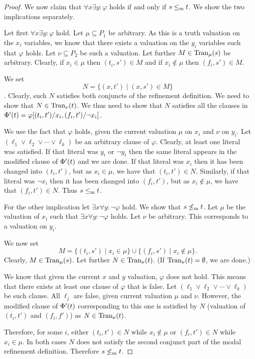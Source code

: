 \begin{proof}
%

We now claim that $\forall x \exists y : \varphi$ holds
if and only if $s \le_\mathrm m t$.
We show the two implications separately. 

Let first $\forall x \exists y : \varphi$ hold.
Let $\mu \subseteq P_1$ be arbitrary. As this is a truth valuation
on the $x_i$ variables, we know that there exists a valuation
on the $y_i$ variables such that $\varphi$ holds. Let $\nu \subseteq P_2$
be such a valuation.
Let further $M \in \mathrm{Tran}_\mu(s)$ be arbitrary.
Clearly, if $x_i \in \mu$ then $(t_i,s') \in M$ and 
if $x_i \not\in \mu$ then $(f_i,s') \in M$.

We set \[N = \{ (x,t') \mid (x,s') \in M\}\]. Clearly, such $N$ satisfies
both conjuncts of the refinement definition. We need to show that 
$N \in \mathrm{Tran}_\nu(t)$. We thus need to show that $N$ satisfies
all the clauses in $\mathrm{\Phi}'(t)=\varphi[(t_i,t')/x_i,(f_i,t')/\neg x_i]$.

We use the fact that $\varphi$ holds, given the current valuation
$\mu$ on $x_i$ and $\nu$ on $y_i$.
Let $(\ell_1 \vee \ell_2 \vee \cdots \vee \ell_k)$ be an arbitrary clause
of $\varphi$. Clearly, at least one literal was satisfied.
If that literal was $y_i$ or $\neg y_i$ then the same literal appears
in the modified clause of $\mathrm{\Phi}'(t)$ and we are done.
If that literal was $x_i$ then it has been changed into
$(t_i,t')$, but as $x_i \in \mu$, we have that $(t_i,t') \in N$.
Similarly, if that literal was $\neg x_i$ then it has been 
changed into $(f_i,t')$, but as $x_i \not\in\mu$, we have
that $(f_i,t') \in N$. Thus $s \le_\mathrm m t$.

For the other implication let 
$\exists x \forall y : \neg \varphi$ hold.  We show that $s \not\le_\mathrm m t$.
Let $\mu$ be the valuation of $x_i$ such that 
$\exists x \forall y : \neg \varphi$ holds.
Let $\nu$ be arbitrary. This corresponds to a valuation on $y_i$.

We now set 
\[
M = \{ (t_i, s') \mid x_i \in \mu \} \cup \{ (f_i, s') \mid x_i \not\in \mu \}.
\] 
Clearly, $M\in\mathrm{Tran}_\mu(s)$. Let further $N \in \mathrm{Tran}_\nu(t)$. (If $\mathrm{Tran}_\nu(t) = \emptyset$, we are done.)

We know that given the current $x$ and $y$ valuation, $\varphi$ does not hold.
This means that there exists at least one clause of $\varphi$ that is false.
Let $(\ell_1 \vee \ell_2 \vee \cdots \vee \ell_k)$ be such clause. 
All $\ell_j$ are false, given current valuation $\mu$ and $\nu$.
However, the modified clause of $\mathrm{\Phi}'(t)$ corresponding to this one
is satisfied by $N$ (valuation of $(t_i,t')$ and $(f_i,f')$) as $N\in\mathrm{Tran}_\nu(t)$.

Therefore, for some $i$,
     either $(t_i,t') \in N$ while $x_i \not \in \mu$
    or $(f_i,t') \in N$ while $x_i \in \mu$.
In both cases $N$ does not satisfy 
the second conjunct part of the modal refinement
definition. Therefore $s \not\le_\mathrm m t$.
\end{proof}

